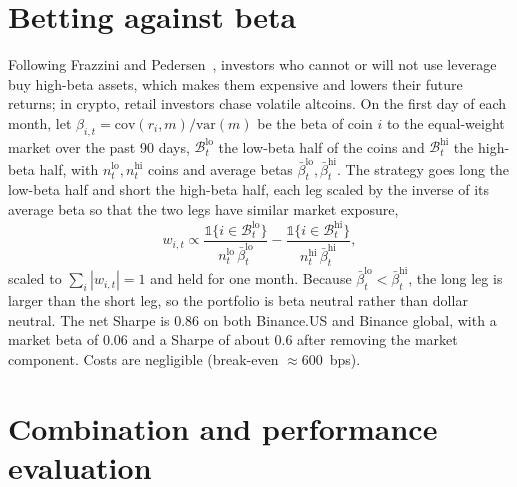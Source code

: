 \documentclass[aps,prl,onecolumn,superscriptaddress,nofootinbib]{revtex4-2}
\begin{document}
	
	\section{Betting against beta}
	\label{app:bab}
	
	Following Frazzini and Pedersen~\cite{frazzini2014}, investors who cannot or will not use leverage buy high-beta assets, which makes them expensive and lowers their future returns; in crypto, retail investors chase volatile altcoins. On the first day of each month, let $\beta_{i,t} = \mathrm{cov}(r_i, m)/\mathrm{var}(m)$ be the beta of coin $i$ to the equal-weight market over the past 90 days, $\mathcal B^{\mathrm{lo}}_t$ the low-beta half of the coins and $\mathcal B^{\mathrm{hi}}_t$ the high-beta half, with $n^{\mathrm{lo}}_t, n^{\mathrm{hi}}_t$ coins and average betas $\bar\beta^{\mathrm{lo}}_t, \bar\beta^{\mathrm{hi}}_t$. The strategy goes long the low-beta half and short the high-beta half, each leg scaled by the inverse of its average beta so that the two legs have similar market exposure,
	\begin{equation}
		w_{i,t} \propto \frac{\mathbb 1\{i \in \mathcal B^{\mathrm{lo}}_t\}}{n^{\mathrm{lo}}_t\, \bar\beta^{\mathrm{lo}}_t} - \frac{\mathbb 1\{i \in \mathcal B^{\mathrm{hi}}_t\}}{n^{\mathrm{hi}}_t\, \bar\beta^{\mathrm{hi}}_t},
		\label{eq:bab}
	\end{equation}
	scaled to $\sum_i |w_{i,t}| = 1$ and held for one month. Because $\bar\beta^{\mathrm{lo}}_t < \bar\beta^{\mathrm{hi}}_t$, the long leg is larger than the short leg, so the portfolio is beta neutral rather than dollar neutral. The net Sharpe is 0.86 on both Binance.US and Binance global, with a market beta of 0.06 and a Sharpe of about 0.6 after removing the market component. Costs are negligible (break-even $\approx 600$~bps).
	
	\section{Combination and performance evaluation}
	\label{app:combo}
	
\end{document}
